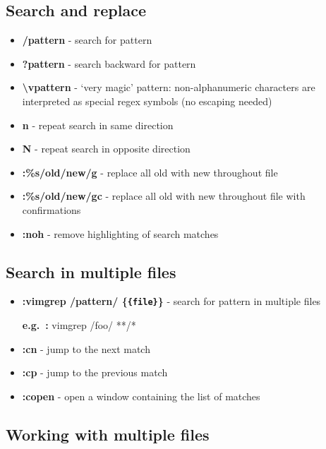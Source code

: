 \documentclass[landscape,twocolumn]{article}
\providecommand{\tightlist}{%
  \setlength{\itemsep}{0pt}\setlength{\parskip}{0pt}}
\begin{document}
\hypertarget{search-and-replace}{%
\subsection{Search and replace}\label{search-and-replace}}

\begin{itemize}
\tightlist
\item
  \textbf{/pattern} - search for pattern
\item
  \textbf{?pattern} - search backward for pattern
\item
    \textbf{\textbackslash vpattern} - `very magic' pattern: non-alphanumeric characters are
  interpreted as special regex symbols (no escaping needed)
\item
  \textbf{n} - repeat search in same direction
\item
  \textbf{N} - repeat search in opposite direction
\item
  \textbf{:\%s/old/new/g} - replace all old with new throughout file
\item
  \textbf{:\%s/old/new/gc} - replace all old with new throughout file
  with confirmations
\item
  \textbf{:noh} - remove highlighting of search matches
\end{itemize}

\hypertarget{search-in-multiple-files}{%
\subsection{Search in multiple files}\label{search-in-multiple-files}}

\begin{itemize}
\item
  \textbf{:vimgrep /pattern/ \{\texttt{\{file\}}\}} - search for pattern
  in multiple files

  \textbf{e.g.~:} vimgrep /foo/ **/*
\item
  \textbf{:cn} - jump to the next match
\item
  \textbf{:cp} - jump to the previous match
\item
  \textbf{:copen} - open a window containing the list of matches
\end{itemize}

\hypertarget{working-with-multiple-files}{%
\subsection{Working with multiple
files}\label{working-with-multiple-files}}
\end{document}
